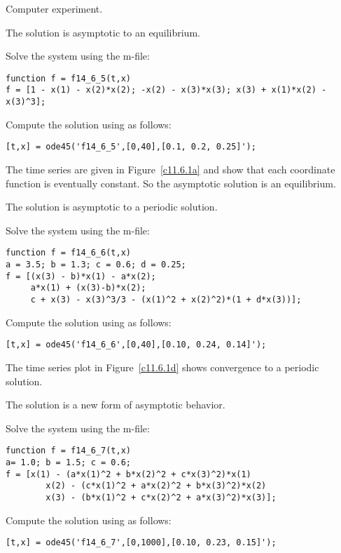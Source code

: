 \newpage
{} Computer experiment.

 \ans The solution is asymptotic to an equilibrium.

\soln Solve the system using the m-file:
\begin{verbatim}
function f = f14_6_5(t,x)
f = [1 - x(1) - x(2)*x(2); -x(2) - x(3)*x(3); x(3) + x(1)*x(2) - x(3)^3];
\end{verbatim}

Compute the solution using \Matlab as follows:
\begin{verbatim}
[t,x] = ode45('f14_6_5',[0,40],[0.1, 0.2, 0.25]');
\end{verbatim}

The time series are given in Figure~\ref{c11.6.1a} and show
that each coordinate function is eventually constant.  So the asymptotic
solution is an equilibrium.

\begin{figure}[htb]
     \centerline{%
     }
\end{figure}

 \ans The solution is asymptotic to a periodic solution.

\soln Solve the system using the m-file:
\begin{verbatim}
function f = f14_6_6(t,x)
a = 3.5; b = 1.3; c = 0.6; d = 0.25;
f = [(x(3) - b)*x(1) - a*x(2); 
     a*x(1) + (x(3)-b)*x(2); 
     c + x(3) - x(3)^3/3 - (x(1)^2 + x(2)^2)*(1 + d*x(3))];
\end{verbatim}

Compute the solution using \Matlab as follows:
\begin{verbatim}
[t,x] = ode45('f14_6_6',[0,40],[0.10, 0.24, 0.14]');
\end{verbatim}
The time series plot in Figure~\ref{c11.6.1d} shows convergence to a periodic 
solution.  

\begin{figure}[htb]
     \centerline{%
     }
\end{figure}

 \ans The solution is a new form of asymptotic behavior.

\soln Solve the system  using the m-file:
\begin{verbatim}
function f = f14_6_7(t,x)
a= 1.0; b = 1.5; c = 0.6;
f = [x(1) - (a*x(1)^2 + b*x(2)^2 + c*x(3)^2)*x(1) 
        x(2) - (c*x(1)^2 + a*x(2)^2 + b*x(3)^2)*x(2)
        x(3) - (b*x(1)^2 + c*x(2)^2 + a*x(3)^2)*x(3)];
\end{verbatim}
Compute the solution using \Matlab as follows:
\begin{verbatim}
[t,x] = ode45('f14_6_7',[0,1000],[0.10, 0.23, 0.15]');
\end{verbatim}

